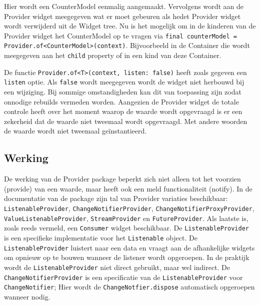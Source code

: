 Hier wordt een CounterModel eenmalig aangemaakt. Vervolgens wordt aan de Provider widget meegegeven wat er moet gebeuren als hedet Provider widget wordt verwijderd uit de Widget tree. Nu is het mogelijk om in de kinderen van de Provider widget het CounterModel op te vragen via \verb|final counterModel = Provider.of<CounterModel>(context)|.
Bijvoorbeeld in de Container die wordt meegegeven aan het \verb|child| property of in een kind van deze Container.

De functie \verb|Provider.of<T>(context, listen: false)| heeft zoals gegeven een \verb|listen| optie. Als \verb|false| wordt meegegeven wordt de widget niet herbouwd bij een wijziging. Bij sommige omstandigheden kan dit van toepassing zijn zodat onnodige rebuilds vermeden worden. Aangezien de Provider widget de totale controle heeft over het moment waarop de waarde wordt opgevraagd is er een zekerheid dat de waarde niet tweemaal wordt opgevraagd. Met andere woorden de waarde wordt niet tweemaal geïnstantieerd.

\subsection*{Werking}
De werking van de Provider package beperkt zich niet alleen tot het voorzien (provide) van een waarde, maar heeft ook een meld functionaliteit (notify).
In de documentatie van de package zijn tal van Provider variaties beschikbaar: \verb|ListenableProvider|, \verb|ChangeNotifierProvider|, \verb|ChangeNotifierProxyProvider|, \verb|ValueListenableProvider|, \verb|StreamProvider| en \verb|FutureProvider|. Als laatste is, zoals reeds vermeld, een \verb|Consumer| widget beschikbaar.
De \verb|ListenableProvider| is een specifieke implementatie voor het \verb|Listenable| object. De \verb|ListenableProvider| luistert naar een data en vraagt aan de afhankelijke widgets om opnieuw op te bouwen wanneer de listener wordt opgeroepen. In de praktijk wordt de \verb|ListenableProvider| niet direct gebruikt, maar wel indirect. De \verb|ChangeNotifierProvider| is een specificatie van de \verb|ListenableProvider| voor \verb|ChangeNotifier|; Hier wordt de \verb|ChangeNotfier.dispose| automatisch opgeroepen wanneer nodig.


